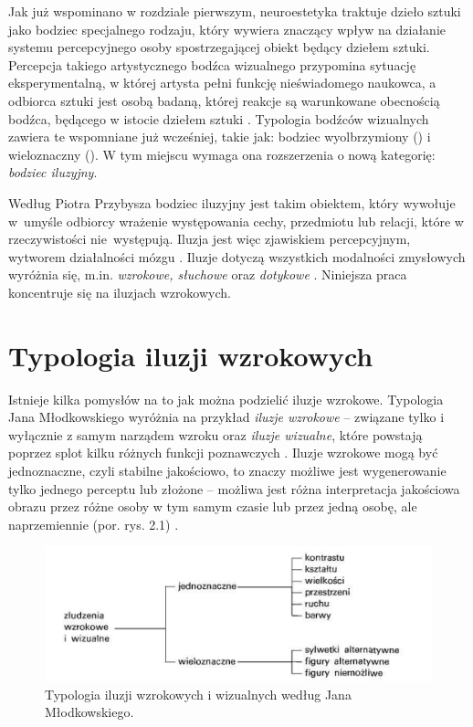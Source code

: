 \documentclass[licencjacka]{kdypl}
\begin{document}
Jak już wspominano w rozdziale pierwszym, neuroestetyka traktuje dzieło sztuki jako bodziec specjalnego rodzaju, który wywiera znaczący wpływ na działanie systemu percepcyjnego osoby spostrzegającej obiekt będący dziełem sztuki. Percepcja takiego artystycznego bodźca wizualnego przypomina sytuację eksperymentalną, w której artysta pełni funkcję nieświadomego naukowca, a odbiorca sztuki jest osobą badaną, której reakcje są warunkowane obecnością bodźca, będącego w istocie dziełem sztuki \citep[s. 108]{neurostetyka}.
Typologia bodźców wizualnych zawiera te wspomniane już wcześniej, takie jak: bodziec wyolbrzymiony (\citeauthor{Rama}) i wieloznaczny (\citeauthor{Zeki}). W tym miejscu wymaga ona rozszerzenia o nową kategorię: \textit{bodziec iluzyjny}.


Według Piotra Przybysza bodziec iluzyjny jest takim obiektem, który  wywołuje w~umyśle odbiorcy wrażenie występowania cechy, przedmiotu lub relacji, które w rzeczywistości nie~występują. Iluzja jest więc zjawiskiem percepcyjnym, wytworem działalności mózgu \citep[s. 115]{neurostetyka}. Iluzje dotyczą wszystkich modalności zmysłowych wyróżnia się, m.in. \textit{wzrokowe, słuchowe} oraz \textit{dotykowe} \citep{Wyklad5}. Niniejsza praca koncentruje się na iluzjach wzrokowych.



\section{Typologia iluzji wzrokowych}

Istnieje kilka pomysłów na to jak można podzielić iluzje wzrokowe.  Typologia Jana Młodkowskiego wyróżnia na przykład  \textit{iluzje wzrokowe} -- związane tylko i wyłącznie z samym narządem wzroku oraz \textit{iluzje wizualne}, które powstają poprzez splot kilku różnych funkcji poznawczych \citep[s. 285]{Mlodkowski}. Iluzje wzrokowe mogą być jednoznaczne, czyli  stabilne jakościowo, to znaczy możliwe jest wygenerowanie tylko jednego perceptu lub złożone -- możliwa jest różna interpretacja jakościowa obrazu przez różne osoby w tym samym czasie lub przez jedną osobę, ale naprzemiennie (por. rys. 2.1) \citep[s. 287]{Mlodkowski}.


\begin{figure}[H]
\includegraphics[width=\textwidth]{mlodkowski.png}
\caption{Typologia iluzji wzrokowych i wizualnych według Jana Młodkowskiego.}
\centering
\end{figure}
\end{document}
